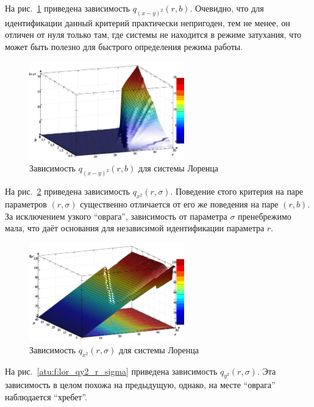 На рис.~\ref{atu:f:lor_qxmy2_r_b} приведена зависимость
$q_{(x-y)^2}(r,b)$.
Очевидно, что для идентификации данный критерий
практически непригоден, тем не менее,
он отличен от нуля только там, где системы не
находится в режиме затухания, что может быть полезно
для быстрого определения режима работы.

\begin{figure}[h!]
  \centerline{  \includegraphics[width=0.60\textwidth]{p/cha/lor/q2d/lor_qxmy2_r_b.png}  }
  \caption{Зависимость $q_{(x-y)^2}(r,b)$ для системы Лоренца}
  \label{atu:f:lor_qxmy2_r_b}
\end{figure}


На рис.~\ref{atu:f:lor_qx2_r_sigma} приведена зависимость
$q_{x^2}(r,\sigma)$.
Поведение єтого критерия на паре параметров $(r,\sigma)$
существенно отличается от его же поведения на паре $(r,b)$.
За исключением узкого ``оврага'', зависимость от параметра $\sigma$
пренебрежимо мала, что даёт основания для
независимой идентификации параметра $r$.

\begin{figure}[h!]
  \centerline{  \includegraphics[width=0.60\textwidth]{p/cha/lor/q2d/lor_qx2_r_sigma.png}  }
  \caption{Зависимость $q_{x^2}(r,\sigma)$ для системы Лоренца}
  \label{atu:f:lor_qx2_r_sigma}
\end{figure}


На рис.~\ref{atu:f:lor_qy2_r_sigma} приведена зависимость
$q_{y^2}(r,\sigma)$.
Эта зависимость в целом похожа на предыдущую,
однако, на месте ``оврага'' наблюдается ``хребет''.

